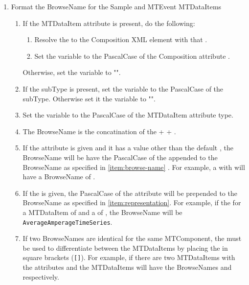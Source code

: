 \begin{enumerate}
  \item Format the \gls{BrowseName} for the \gls{Sample} and \gls{MTEvent} \glspl{MTDataItem}
  \begin{enumerate}[after=\vspace{\baselineskip}]
    \setlength\itemsep{1em}
    \item If the \gls{MTDataItem} attribute  is present, do the following:
    \begin{enumerate}
      \item Resolve the  to the \gls{Composition} XML element with that .
      \item Set the variable  to the \gls{PascalCase} of the \gls{Composition} attribute .
    \end{enumerate}
    Otherwise, set the variable  to "".
    \item If the \gls{subType} is present, set the variable  to the \gls{PascalCase} of the \gls{subType}. Otherwise set it the variable  to "".
    \item Set the variable  to the \gls{PascalCase} of the \gls{MTDataItem} attribute \gls{type}.
    \item The \gls{BrowseName} is the concatination of the  +  + . \label{item:browse-name}
    \item If the  attribute is given and it has a value other than the default , the \gls{BrowseName} will be have the \gls{PascalCase} of the  appended to the \gls{BrowseName}  as specified in \ref{item:browse-name} . For example, a  with  will have a \gls{BrowseName} of . \label{item:representation}
    \item If the  is given, the \gls{PascalCase} of the  attribute will be prepended to the \gls{BrowseName}  as specified in \ref{item:representation}. For example, if the  for a \gls{MTDataItem} of  and a  of , the \gls{BrowseName} will be  \texttt{AverageAmperageTimeSeries}. \label{item:statistic}
    \item If two \glspl{BrowseName} are identical for the same \gls{MTComponent}, the  must be used to differentiate between the \glspl{MTDataItem} by placing the  in square brackets (\texttt{[]}). For example, if there are two  \glspl{MTDataItem} with the attributes  and  the \glspl{MTDataItem} will have the \glspl{BrowseName}  and  respectively. \label{item:data-item-name}
  \end{enumerate} 


\end{enumerate}

